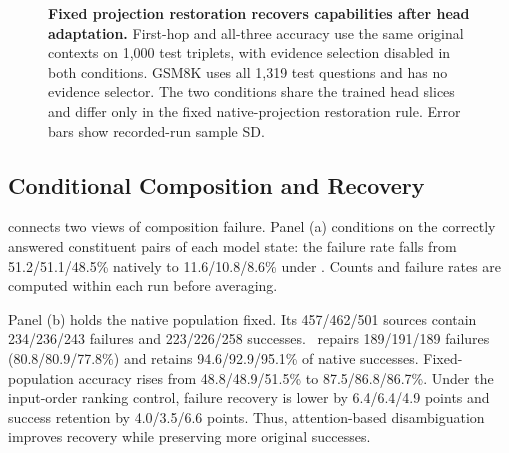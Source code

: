 \begin{figure}[!htbp]
  \centering
  \begin{minipage}{1\textwidth}\centering
  \par
  \caption{\textbf{Fixed projection restoration recovers capabilities after head adaptation.} First-hop and all-three accuracy use the same original contexts on 1,000 test triplets, with evidence selection disabled in both conditions. GSM8K uses all 1,319 test questions and has no evidence selector. The two conditions share the trained head slices and differ only in the fixed native-projection restoration rule. Error bars show recorded-run sample SD.}
  \label{fig:ablations}
\end{minipage}
\end{figure}

\subsection{Conditional Composition and Recovery}

 connects two views of composition failure. Panel (a) conditions on the correctly answered constituent pairs of each model state: the failure rate falls from 51.2/51.1/48.5\% natively to 11.6/10.8/8.6\% under \method. Counts and failure rates are computed within each run before averaging.

Panel (b) holds the native population fixed. Its 457/462/501 sources contain 234/236/243 failures and 223/226/258 successes. \method\ repairs 189/191/189 failures (80.8/80.9/77.8\%) and retains 94.6/92.9/95.1\% of native successes. Fixed-population accuracy rises from 48.8/48.9/51.5\% to 87.5/86.8/86.7\%. Under the input-order ranking control, failure recovery is lower by 6.4/6.4/4.9 points and success retention by 4.0/3.5/6.6 points. Thus, attention-based disambiguation improves recovery while preserving more original successes.

\begin{table}[!htbp]
  \centering
  \caption{\textbf{Conditional composition and recovery of native errors.} (a) Each model state's own constituent-correct set, with run-mean population and failure counts; conditional failure rates are computed per run before averaging. (b) Fixed native constituent-correct populations. Recovery counts corrected native failures; retention counts native successes that remain correct; fixed-population accuracy covers both groups. Percentages are mean $\pm$ sample SD; Native is measured once.}
  \label{tab:conditional_composition}
  \label{tab:fixed_population}
  \small\setlength{\tabcolsep}{5pt}
  
\end{table}


